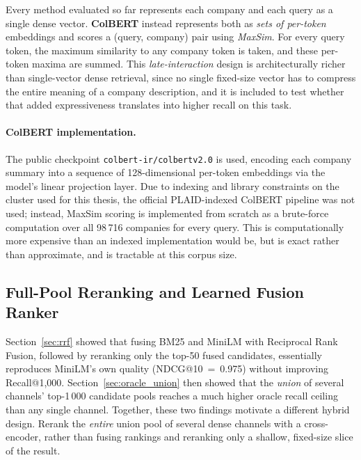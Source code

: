 \documentclass[a4paper,oneside,bibliography=totoc]{scrbook}
\begin{document}
\label{sec:colbert}

Every method evaluated so far represents each company and each query as a single dense vector. \textbf{ColBERT} \citep{khattab2020colbert, santhanam2022colbertv2} instead represents both as \emph{sets of per-token} embeddings and scores a (query, company) pair using \emph{MaxSim}. For every query token, the maximum similarity to any company token is taken, and these per-token maxima are summed. This \emph{late-interaction} design is architecturally richer than single-vector dense retrieval, since no single fixed-size vector has to compress the entire meaning of a company description, and it is included to test whether that added expressiveness translates into higher recall on this task.

\paragraph{ColBERT implementation.} The public checkpoint \texttt{colbert-ir/colbertv2.0} is used, encoding each company summary into a sequence of 128-dimensional per-token embeddings via the model's linear projection layer. Due to indexing and library constraints on the cluster used for this thesis, the official PLAID-indexed ColBERT pipeline was not used; instead, MaxSim scoring is implemented from scratch as a brute-force computation over all 98\,716 companies for every query. This is computationally more expensive than an indexed implementation would be, but is exact rather than approximate, and is tractable at this corpus size.

\subsection{Full-Pool Reranking and Learned Fusion Ranker}
\label{sec:hybrid_fullpool}

Section~\ref{sec:rrf} showed that fusing BM25 and MiniLM with Reciprocal Rank Fusion, followed by reranking only the top-50 fused candidates, essentially reproduces MiniLM's own quality (NDCG@10~=~0.975) without improving Recall@1{,}000. Section~\ref{sec:oracle_union} then showed that the \emph{union} of several channels' top-1\,000 candidate pools reaches a much higher oracle recall ceiling than any single channel. Together, these two findings motivate a different hybrid design. Rerank the \emph{entire} union pool of several dense channels with a cross-encoder, rather than fusing rankings and reranking only a shallow, fixed-size slice of the result.
\end{document}
